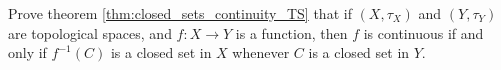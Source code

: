 \begin{comment}

\ExerciseSolution Let $f : X \to Y$ be a bijection such that $d_X(x,y) = d_Y(f(x),f(y))$ for all $x, y \in X$. To show that $f$ is continuous in the metric topology, we will show that the inverse of any open ball in $Y$ is an open set in $X$. Let $B_Y = B(z,\delta)$ be an open ball in $Y$. Let $B_X = f^{-1}(B_Y)$. We will show that $B_X = B(f^{-1}(z), \delta)$ in $X$, which will verify that the inverse image of $B_Y$ under $f$ is an open set in $X$. 

Let $x \in B_X$. Then $x = f^{-1}(t)$ for some $t \in B_Y$, or $t = f(x)$. It follows that 
\[d_X(x,f^{-1}(z)) = d_Y(f(x),f(f^{-1}(z))) = d_Y(t,z) < \delta.\]
Thus, $x \in B(f^{-1}(z), \delta)$ and $B_X \subseteq B(f^{-1}(z), \delta)$. 

Now let $x \in B(f^{-1}(z), \delta)$. Then $d_X(x, f^{-1}(z)) < \delta$. Let $t = f(x)$. It follows that 
\[d_Y(t,z) = d_X(f^{-1}(t), f^{-1}(z)) = d_X(x, f^{-1}(z)) < \delta.\]
Thus, $t \in B_Y$ and $x \in f^{-1}(B_Y)$ or $x \in B_X$.  This shows that $B(f^{-1}(z), \delta) \subseteq B_X$, which allows us to conclude that $B_X = B(f^{-1}(z), \delta)$. Therefore, $f$ is continuous. The same argument applied to $f^{-1}$ shows that $f^{-1}$ is also continuous. So $X$ and $Y$ are topologically equivalent. 

\end{comment}

\item \label{ex:closed_sets_continuity_TS} Prove theorem \ref{thm:closed_sets_continuity_TS} that if $(X,\tau_X)$ and $(Y, \tau_Y)$ are topological spaces, and $f: X \to Y$ is a function, then $f$ is continuous if and only if $f^{-1}(C)$ is a closed set in $X$ whenever $C$ is a closed set in $Y$. 

\begin{comment}

\ExerciseSolution Assume that $f$ is a continuous function, and let $C$ be a closed set in $Y$. Since $C$ is closed, we know that $Y \setminus C$ is open. The continuity of $f$ means that $f^{-1}(Y \setminus C)$ is also open. Activity \ref{act:CS_1} tell us that $f^{-1}(Y \setminus B) = X \setminus f^{-1}(C)$. The fact that $X \setminus f^{-1}(C)$ is open implies that $f^{-1}(C)$ is closed. 

Now we assume that inverse images of closes sets are closed, and show that $f$ is a continuous function. Let $O$ be an open set in $Y$. Then $Y \setminus O$ is a closed set. Activity \ref{act:CS_1} tells us that $f^{-1}(Y \setminus O) = X \setminus f^{-1}(O)$. That $X \setminus f^{-1}(O)$ is closed means that $f^{-1}(O)$ is open. Thus, $f$ is a continuous function. 

\end{comment}



